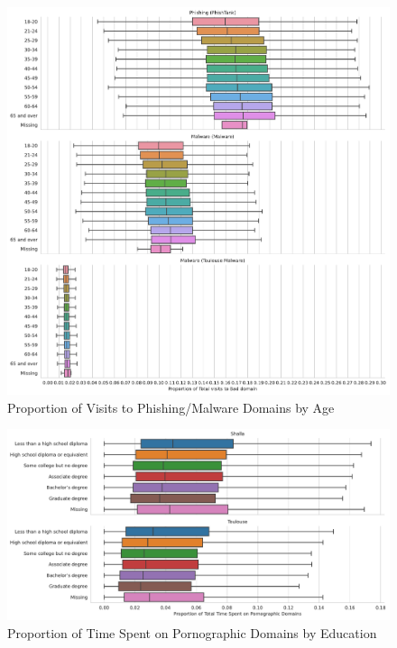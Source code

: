 \documentclass[12pt, letterpaper]{article}
\begin{document}
\begin{figure}[!htb]
	 \centering
	 \caption{Proportion of Visits to Phishing/Malware Domains by Age}
	 \label{fig:prop_total_visits_phishing_malware_age}
	 \includegraphics[width=\textwidth]{figs/prop_total_visits_phishing_malware_tl_age.pdf}
\end{figure}


\begin{figure}[!htb]
  \centering
  \caption{Proportion of Time Spent on Pornographic Domains by Education}
	\label{fig:prop_time_porn_educ}
	\includegraphics[width=\textwidth]{figs/prop_total_time_porn_educ.pdf}
\end{figure}
\end{document}
